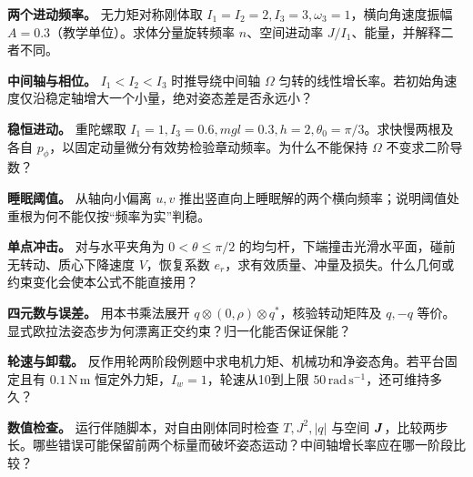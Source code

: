 \begin{bookexercises}
\item {} \textbf{两个进动频率。} 无力矩对称刚体取 $I_1=I_2=2,I_3=3,\omega_3=1$，横向角速度振幅 $A=0.3$（教学单位）。求体分量旋转频率 $n$、空间进动率 $J/I_1$、能量，并解释二者不同。
\item {} \textbf{中间轴与相位。} $I_1<I_2<I_3$ 时推导绕中间轴 $\Omega$ 匀转的线性增长率。若初始角速度仅沿稳定轴增大一个小量，绝对姿态差是否永远小？
\item {} \textbf{稳恒进动。} 重陀螺取 $I_1=1,I_3=0.6,mgl=0.3,h=2,\theta_0=\pi/3$。求快慢两根及各自 $p_\phi$，以固定动量微分有效势检验章动频率。为什么不能保持 $\Omega$ 不变求二阶导数？
\item {} \textbf{睡眠阈值。} 从轴向小偏离 $u,v$ 推出竖直向上睡眠解的两个横向频率；说明阈值处重根为何不能仅按“频率为实”判稳。
\item {} \textbf{单点冲击。} 对与水平夹角为 $0<\theta\le\pi/2$ 的均匀杆，下端撞击光滑水平面，碰前无转动、质心下降速度 $V$，恢复系数 $e_r$，求有效质量、冲量及损失。什么几何或约束变化会使本公式不能直接用？
\item {} \textbf{四元数与误差。} 用本书乘法展开 $q\otimes(0,\rho)\otimes q^*$，核验转动矩阵及 $q,-q$ 等价。显式欧拉法姿态步为何漂离正交约束？归一化能否保证保能？
\item {} \textbf{轮速与卸载。} 反作用轮两阶段例题中求电机力矩、机械功和净姿态角。若平台固定且有 $0.1\,\mathrm{N\,m}$ 恒定外力矩，$I_w=1$，轮速从10到上限 $50\,\mathrm{rad\,s^{-1}}$，还可维持多久？
\item {} \textbf{数值检查。} 运行伴随脚本，对自由刚体同时检查 $T,J^2,|q|$ 与空间 $\boldsymbol{J}$，比较两步长。哪些错误可能保留前两个标量而破坏姿态运动？中间轴增长率应在哪一阶段比较？
\end{bookexercises}

